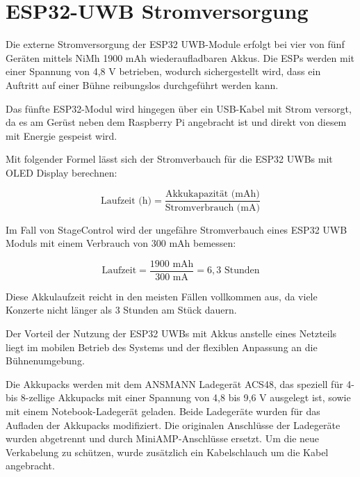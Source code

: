 \newpage
\section{ESP32-UWB Stromversorgung}
Die externe Stromversorgung der ESP32 UWB-Module erfolgt bei vier von fünf Geräten mittels NiMh 1900 mAh wiederaufladbaren Akkus. Die ESPs werden mit einer Spannung von 4,8 V betrieben, wodurch sichergestellt wird, dass ein Auftritt auf einer Bühne reibungslos durchgeführt werden kann.  

Das fünfte ESP32-Modul wird hingegen über ein USB-Kabel mit Strom versorgt, da es am Gerüst neben dem Raspberry Pi angebracht ist und direkt von diesem mit Energie gespeist wird.

Mit folgender Formel lässt sich der Stromverbauch für die ESP32 UWBs mit OLED Display berechnen:

\[
\text{Laufzeit (h)} = \frac{\text{Akkukapazität (mAh)}}{\text{Stromverbrauch (mA)}}
\]

Im Fall von StageControl wird der ungefähre Stromverbauch eines ESP32 UWB Moduls mit einem Verbrauch von 300 mAh bemessen:

\[
\text{Laufzeit} = \frac{1900 \text{ mAh}}{300 \text{ mA}} = 6,3 \text{ Stunden}
\]

Diese Akkulaufzeit reicht in den meisten Fällen vollkommen aus, da viele Konzerte nicht länger als 3 Stunden am Stück dauern.

Der Vorteil der Nutzung der ESP32 UWBs mit Akkus anstelle eines Netzteils liegt im mobilen Betrieb des Systems und der flexiblen Anpassung an die Bühnenumgebung.

Die Akkupacks werden mit dem ANSMANN Ladegerät ACS48, das speziell für 4- bis 8-zellige Akkupacks mit einer Spannung von 4,8 bis 9,6 V ausgelegt ist, sowie mit einem Notebook-Ladegerät geladen. Beide Ladegeräte wurden für das Aufladen der Akkupacks modifiziert. Die originalen Anschlüsse der Ladegeräte wurden abgetrennt und durch MiniAMP-Anschlüsse ersetzt. Um die neue Verkabelung zu schützen, wurde zusätzlich ein Kabelschlauch um die Kabel angebracht.  

